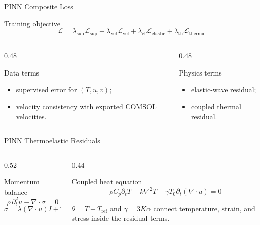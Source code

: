 \begin{frame}{PINN Composite Loss}
  \begin{block}{Training objective}
    \[
      \mathcal{L}=\lambda_{\mathrm{sup}}\mathcal{L}_{\mathrm{sup}}
      +\lambda_{\mathrm{vel}}\mathcal{L}_{\mathrm{vel}}
      +\lambda_{\mathrm{el}}\mathcal{L}_{\mathrm{elastic}}
      +\lambda_{\mathrm{th}}\mathcal{L}_{\mathrm{thermal}}
    \]
  \end{block}
  \begin{columns}[T]
    \begin{column}{0.48\textwidth}
      \footnotesize
      \begin{block}{Data terms}
        \begin{itemize}
          \item supervised error for $(T,u,v)$;
          \item velocity consistency with exported COMSOL velocities.
        \end{itemize}
      \end{block}
    \end{column}
    \begin{column}{0.48\textwidth}
      \footnotesize
      \begin{block}{Physics terms}
        \begin{itemize}
          \item elastic-wave residual;
          \item coupled thermal residual.
        \end{itemize}
      \end{block}
    \end{column}
  \end{columns}
\end{frame}

\begin{frame}{PINN Thermoelastic Residuals}
  \begin{columns}[T]
    \begin{column}{0.52\textwidth}
      \begin{block}{Momentum balance}
        \[
          \rho\,\partial_t^2 u-\nabla\!\cdot\!\sigma=0
        \]
        \[
          \sigma=\lambda(\nabla\!\cdot\!u)I+2\mu\varepsilon-
          \gamma\theta I
        \]
      \end{block}
    \end{column}
    \begin{column}{0.44\textwidth}
      \begin{block}{Coupled heat equation}
        \[
          \rho C_p\partial_tT-k\nabla^2T+
          \gamma T_0\partial_t(\nabla\!\cdot\!u)=0
        \]
      \end{block}
      \scriptsize
      $\theta=T-T_{\mathrm{ref}}$ and $\gamma=3K\alpha$ connect temperature,
      strain, and stress inside the residual terms.
    \end{column}
  \end{columns}
\end{frame}

